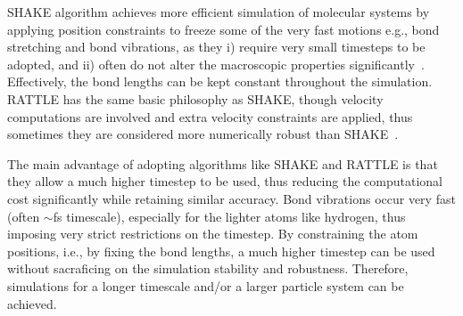 \documentclass[a4paper,10pt,twocolumn]{article}
\begin{document}
SHAKE algorithm achieves more efficient simulation of molecular systems by applying position constraints to freeze some of the very fast motions e.g., bond stretching and bond vibrations, as they i) require very small timesteps to be adopted, and ii) often do not alter the macroscopic properties significantly~\cite{ryckaert1977numerical}. Effectively, the bond lengths can be kept constant throughout the simulation. RATTLE has the same basic philosophy as SHAKE, though velocity computations are involved and extra velocity constraints are applied, thus sometimes they are considered more numerically robust than SHAKE~\cite{andersen1983rattle}.

The main advantage of adopting algorithms like SHAKE and RATTLE is that they allow a much higher timestep to be used, thus reducing the computational cost significantly while retaining similar accuracy. Bond vibrations occur very fast (often $\sim$fs timescale), especially for the lighter atoms like hydrogen, thus imposing very strict restrictions on the timestep. By constraining the atom positions, i.e., by fixing the bond lengths, a much higher timestep can be used without sacraficing on the simulation stability and robustness. Therefore, simulations for a longer timescale and/or a larger particle system can be achieved.

{\small
\setlength{\bibsep}{0pt}


}
\end{document}
